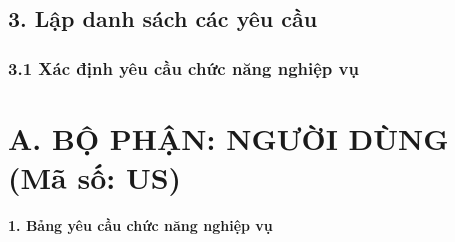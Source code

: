 \documentclass[12pt,a4paper]{article}
\begin{document}
\hrulefill

\subsection*{3. Lập danh sách các yêu cầu}
\subsubsection*{3.1 Xác định yêu cầu chức năng nghiệp vụ}

\section*{A. BỘ PHẬN: NGƯỜI DÙNG (Mã số: US)}

\textbf{1. Bảng yêu cầu chức năng nghiệp vụ}
\end{document}
